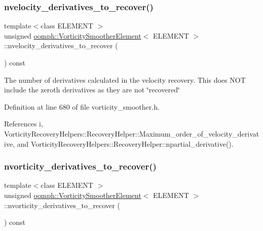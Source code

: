 \subsubsection{\texorpdfstring{nvelocity\+\_\+derivatives\+\_\+to\+\_\+recover()}{nvelocity\_derivatives\_to\_recover()}}
{\footnotesize\ttfamily template$<$class E\+L\+E\+M\+E\+NT $>$ \\
unsigned \hyperlink{classoomph_1_1VorticitySmootherElement}{oomph\+::\+Vorticity\+Smoother\+Element}$<$ E\+L\+E\+M\+E\+NT $>$\+::nvelocity\+\_\+derivatives\+\_\+to\+\_\+recover (\begin{DoxyParamCaption}{ }\end{DoxyParamCaption}) const\hspace{0.3cm}{\ttfamily [inline]}}

The number of derivatives calculated in the velocity recovery. This does N\+OT include the zeroth derivatives as they are not \char`\"{}recovered\char`\"{} 

Definition at line 680 of file vorticity\+\_\+smoother.\+h.



References i, Vorticity\+Recovery\+Helpers\+::\+Recovery\+Helper\+::\+Maximum\+\_\+order\+\_\+of\+\_\+velocity\+\_\+derivative, and Vorticity\+Recovery\+Helpers\+::\+Recovery\+Helper\+::npartial\+\_\+derivative().

\mbox{\label{classoomph_1_1VorticitySmootherElement_a7a433092a73a9fed26330e247a415414}} 
\subsubsection{\texorpdfstring{nvorticity\+\_\+derivatives\+\_\+to\+\_\+recover()}{nvorticity\_derivatives\_to\_recover()}}
{\footnotesize\ttfamily template$<$class E\+L\+E\+M\+E\+NT $>$ \\
unsigned \hyperlink{classoomph_1_1VorticitySmootherElement}{oomph\+::\+Vorticity\+Smoother\+Element}$<$ E\+L\+E\+M\+E\+NT $>$\+::nvorticity\+\_\+derivatives\+\_\+to\+\_\+recover (\begin{DoxyParamCaption}{ }\end{DoxyParamCaption}) const\hspace{0.3cm}{\ttfamily [inline]}}



